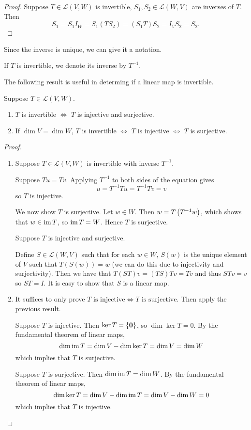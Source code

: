 \begin{proof}
Suppose $T\in\mathcal{L}(V,W)$ is invertible, $S_1,S_2\in\mathcal{L}(W,V)$ are inverses of $T$. Then
\[S_1=S_1I_W=S_1(TS_2)=(S_1T)S_2=I_VS_2=S_2.\]
\end{proof}

Since the inverse is unique, we can give it a notation.

\begin{notation}
If $T$ is invertible, we denote its inverse by $T^{-1}$.
\end{notation}

The following result is useful in determing if a linear map is invertible.

\begin{lemma}\label{lemma:invertibility-criterion}
Suppose $T\in\mathcal{L}(V,W)$.
\begin{enumerate}[label=(\roman*)]
\item $T$ is invertible $\iff$ $T$ is injective and surjective.
\item If $\dim V=\dim W$, $T$ is invertible $\iff$ $T$ is injective $\iff$ $T$ is surjective.
\end{enumerate}
\end{lemma}

\begin{proof} \
\begin{enumerate}[label=(\roman*)]
\item \fbox{$\implies$} Suppose $T\in\mathcal{L}(V,W)$ is invertible with inverse $T^{-1}$. 

Suppose $Tu=Tv$. Applying $T^{-1}$ to both sides of the equation gives
\[u=T^{-1}Tu=T^{-1}Tv=v\]
so $T$ is injective.

We now show $T$ is surjective. Let $w\in W$. Then $w=T\left(T^{-1}w\right)$, which shows that $w\in\operatorname{im} T$, so $\operatorname{im} T=W$. Hence $T$ is surjective.

\fbox{$\impliedby$} Suppose $T$ is injective and surjective.

Define $S\in\mathcal{L}(W,V)$ such that for each $w\in W$, $S(w)$ is the unique element of $V$ such that $T(S(w))=w$ (we can do this due to injectivity and surjectivity). Then we have that $T(ST)v=(TS)Tv=Tv$ and thus $STv=v$ so $ST=I$. It is easy to show that $S$ is a linear map.

\item It suffices to only prove $T\text{ is injective}\iff T\text{ is surjective}$. Then apply the previous result.

\fbox{$\implies$} Suppose $T$ is injective. Then $\ker T=\{\vb{0}\}$, so $\dim\ker T=0$. By the fundamental theorem of linear maps,
\[\dim\operatorname{im} T=\dim V-\dim\ker T
=\dim V
=\dim W\]
which implies that $T$ is surjective.

\fbox{$\impliedby$} Suppose $T$ is surjective. Then $\dim\operatorname{im} T=\dim W$. By the fundamental theorem of linear maps,
\[\dim\ker T=\dim V-\dim\operatorname{im} T
=\dim V-\dim W
=0\]
which implies that $T$ is injective.
\end{enumerate}
\end{proof}

